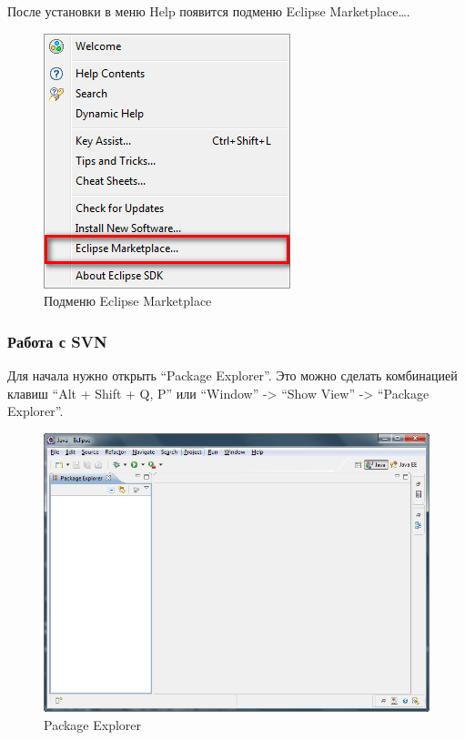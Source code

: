 \documentclass[a4paper,12pt]{article}
\begin{document}
После установки в меню Help появится подменю Eclipse Marketplace\ldots.

\begin{figure}[h!]
	\centering
	\includegraphics[scale=0.60]{eclipse-marketplace-instalation-7.png}
	\vspace{-10pt}
	\caption{Подменю Eclipse Marketplace}
\end{figure}

\subsubsection{Работа с SVN}

Для начала нужно открыть ``Package Explorer''. Это можно сделать
комбинацией клавиш ``Alt + Shift + Q, P'' или ``Window'' -\textgreater{}
``Show View'' -\textgreater{} ``Package Explorer''.

\begin{figure}[h!]
	\centering
	\includegraphics[scale=0.60]{eclipse.png}
	\caption{Package Explorer}
\end{figure}
\end{document}
